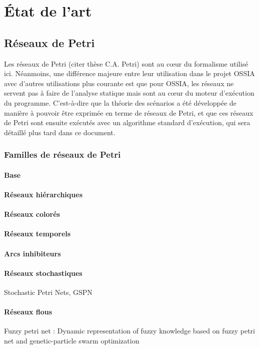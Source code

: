 \chapter{État de l'art}

\section{Réseaux de Petri}
Les réseaux de Petri (citer thèse C.A. Petri) sont au cœur du formalisme utilisé ici. Néanmoins, une différence majeure entre leur utilisation dans le projet \ac{OSSIA} avec d'autres utilisations plus courante est que pour \ac{OSSIA}, les réseaux ne servent pas à faire de l'analyse statique mais sont au cœur du moteur d'exécution du programme. C'est-à-dire que la théorie des scénarios a été développée de manière à pouvoir être exprimée en terme de réseaux de Petri, et que ces réseaux de Petri sont ensuite exécutés avec un algorithme standard d'exécution, qui sera détaillé plus tard dans ce document.

\subsection{Familles de réseaux de Petri}
\subsubsection{Base}
\subsubsection{Réseaux hiérarchiques}
\subsubsection{Réseaux colorés}
\subsubsection{Réseaux temporels}
\subsubsection{Arcs inhibiteurs}
\subsubsection{Réseaux stochastiques}
Stochastic Petri Nets, GSPN
\subsubsection{Réseaux flous}
Fuzzy petri net : Dynamic representation of fuzzy knowledge based on fuzzy petri net and genetic-particle swarm optimization
